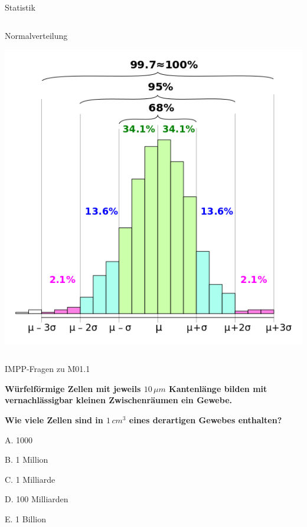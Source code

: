 \documentclass{beamer}
\begin{document}
\begin{frame}{Statistik}
\begin{columns}[c]
\begin{column}{6cm}
\begin{block}{Normalverteilung }
\begin{center}
    \includegraphics[width=\textwidth]{Empirical_rule_histogram.png}
\end{center}


\end{block}

\end{column}


\end{columns}



    
\end{frame}





\begin{frame}{IMPP-Fragen zu M01.1}

\textbf{Würfelförmige Zellen mit jeweils \(10\,\mu m\) Kantenlänge  bilden mit vernachlässigbar kleinen Zwischenräumen ein Gewebe.}

\textbf{Wie viele Zellen sind in \(1\,cm^3 \) eines derartigen Gewebes enthalten?} \\[0.2 cm]

\begin{description}
\item{A.}
1000
\item{B.}
1 Million
\item{C.}
1 Milliarde %
\item{D.}
100 Milliarden
\item{E.}
1 Billion
\end{description}

    
\end{frame}
\end{document}
